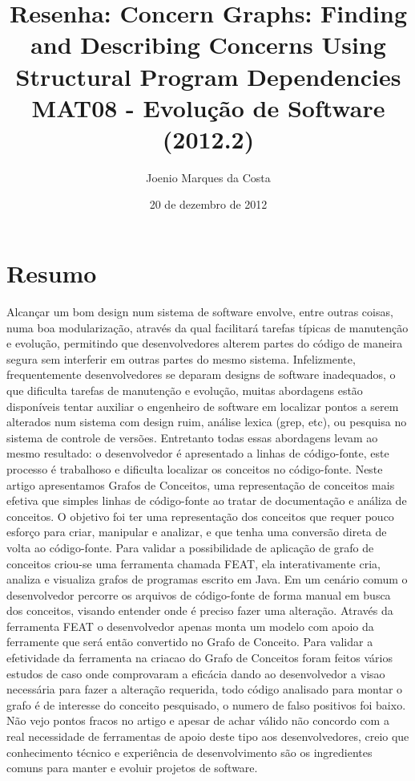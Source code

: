 \documentclass[12pt]{article}
\title{Resenha: Concern Graphs: Finding and Describing Concerns Using
 Structural Program Dependencies\cite{ConcernGraphs} \\
 \large MAT08 - Evolução de Software (2012.2)}
\author{Joenio Marques da Costa}
\date{20 de dezembro de 2012}
\begin{document}
\maketitle

\section*{Resumo}

Alcançar um bom design num sistema de software envolve, entre outras coisas,
numa boa modularização, através da qual facilitará tarefas típicas de
manutenção e evolução, permitindo que desenvolvedores alterem partes do código
de maneira segura sem interferir em outras partes do mesmo sistema.
Infelizmente, frequentemente desenvolvedores se deparam designs de software
inadequados, o que dificulta tarefas de manutenção e evolução, muitas
abordagens estão disponíveis tentar auxiliar o engenheiro de software em
localizar pontos a serem alterados num sistema com design ruim, análise lexica
(grep, etc), ou pesquisa no sistema de controle de versões.  Entretanto todas
essas abordagens levam ao mesmo resultado: o desenvolvedor é apresentado a
linhas de código-fonte, este processo é trabalhoso e dificulta localizar os
conceitos no código-fonte. Neste artigo apresentamos Grafos de Conceitos, uma
representação de conceitos mais efetiva que simples linhas de código-fonte ao
tratar de documentação e análiza de conceitos. O objetivo foi ter uma
representação dos conceitos que requer pouco esforço para criar, manipular e
analizar, e que tenha uma conversão direta de volta ao código-fonte. Para
validar a possibilidade de aplicação de grafo de conceitos criou-se uma
ferramenta chamada FEAT, ela interativamente cria, analiza e visualiza grafos
de programas escrito em Java. Em um cenário comum o desenvolvedor percorre os
arquivos de código-fonte de forma manual em busca dos conceitos, visando
entender onde é preciso fazer uma alteração. Através da ferramenta FEAT o
desenvolvedor apenas monta um modelo com apoio da ferramente que será então
convertido no Grafo de Conceito. Para validar a efetividade da ferramenta na
criacao do Grafo de Conceitos foram feitos vários estudos de caso onde
comprovaram a eficácia dando ao desenvolvedor a visao necessária para fazer a
alteração requerida, todo código analisado para montar o grafo é de interesse
do conceito pesquisado, o numero de falso positivos foi baixo. Não vejo
pontos fracos no artigo e apesar de achar válido não concordo com a
real necessidade de ferramentas de apoio deste tipo aos desenvolvedores,
creio que conhecimento técnico e experiência de desenvolvimento são
os ingredientes comuns para manter e evoluir projetos de software.


\end{document}
